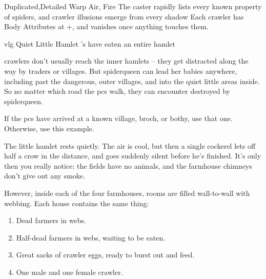 

  {Duplicated,Detailed}%
  {Warp}%
  {Air, Fire}%
  {}%
  {The caster rapidly lists every known property of spiders, and  \gls{crawler} illusions emerge from every shadow}%
  {Each \gls{crawler} has Body Attributes at +, and vanishes once anything touches them.}

{\gls{vlg} Quiet Little Hamlet}%
{'s  have eaten an entire hamlet}%

\Glspl{crawler} don't usually reach the inner hamlets -- they get distracted along the way by traders or \glspl{village}.
But \gls{spiderqueen} can lead her babies anywhere, including past the dangerous, outer \glspl{village}, and into the quiet little areas inside.
So no matter which road the \glspl{pc} walk, they can encounter  destroyed by \gls{spiderqueen}.

If the \glspl{pc} have arrived at a known \gls{village}, \gls{broch}, or \gls{bothy}, use that one.
Otherwise, use this example.

\begin{boxtext}
  The little hamlet rests quietly.
  The air is cool, but then a single cockerel lets off half a crow in the distance, and goes suddenly silent before he's finished.
  It's only then you really notice: the fields have no animals, and the farmhouse chimneys don't give out any smoke.
\end{boxtext}

However, inside each of the four farmhouses, rooms are filled wall-to-wall with webbing.  Each house contains the same thing:

\begin{enumerate}
  \item
  Dead farmers in webs.
  \item
  Half-dead farmers in webs, waiting to be eaten.
  \item
  Great sacks of \gls{crawler} eggs, ready to burst out and feed.
  \item
    One male and one female \gls{crawler}.
\end{enumerate}


